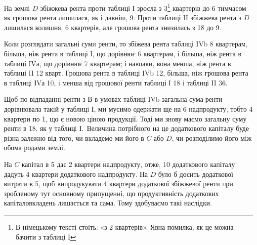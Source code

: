 
На землі $D$ збіжжева рента проти таблиці I зросла з 3\footnote*{
В німецькому тексті стоїть: «з 2 квартерів». Явна помилка, як це можна бачити з таблиці І 
} квартерів до 6
тимчасом як грошова рента лишилася, як і давніш, 9. Проти таблиці II
збіжжева рента з $D$ лишилася колишня, 6 квартерів, але грошова рента знизилась
з 18 до 9.

Коли розглядати загальні суми ренти, то збіжева рента таблиці IVb \deq{} 8
квартерам, більша, ніж рента в таблиці І, що дорівнює 6 квартерам, і більша,
ніж рента в таблиці IVа, що дорівнює 7 квартерам; і навпаки, вона менша, ніж
рента в таблиці II \deq{} 12 кварт. Грошова рента в таблиці IVb \deq{} 12,
більша, ніж грошова рента в таблиці ІVа \deq{} 10, і менша від грошової
ренти таблиці І \deq{} 18 і таблиці II \deq{} 36.

Щоб по відпаданні ренти з $В$ в умовах таблиці IVb загальна сума ренти
дорівнювала такій у таблиці I, ми мусимо одержати ще на 6
надпродукту, тобто 4 квартери по 1, що є новою ціною продукції.
Тоді ми знову маємо загальну суму ренти в 18, як у таблиці І.~Величина
потрібного на це додаткового капіталу буде різна залежно від того, чи
вкладемо ми його в $C$ або $D$, чи розподілимо його між обома родами землі.

На $C$ капітал в 5 дає 2 квартери надпродукту, отже, 10
додаткового капіталу дадуть 4 квартери додаткового надпродукту. На $D$ було б
досить додаткової витрати в 5, щоб випродукувати 4 квартери додаткової
збіжжевої ренти при зробленому тут основному припущенні, що продуктивність
додаткових капіталовкладень лишається та сама. Тому здобуваємо
такі наслідки.

